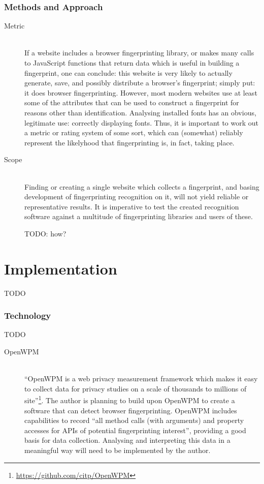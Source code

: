 \documentclass[a4paper, 12pt]{scrreprt}
\begin{document}
    \subsection{Methods and Approach}
    \begin{description}
        \item[Metric] \hfill \\
            If a website includes a browser fingerprinting library, or makes many calls to JavaScript functions that return
            data which is useful in building a fingerprint, one can conclude: this website is very likely to actually
            generate, save, and possibly distribute a browser's fingerprint; simply put: it does browser fingerprinting.
            However, most modern websites use at least some of the attributes that can be used to construct a fingerprint
            for reasons other than identification. Analysing installed fonts has an obvious, legitimate use: correctly displaying
            fonts. Thus, it is important to work out a metric or rating system of some sort, which can
            (somewhat) reliably represent the likelyhood that fingerprinting is, in fact, taking place.

        \item[Scope] \hfill \\
            Finding or creating a single website which collects a fingerprint, and basing development of fingerprinting
            recognition on it, will not yield reliable or representative results. It is imperative to test
            the created recognition software against a multitude of fingerprinting libraries and users of these.

            TODO: how?
    \end{description}

\chapter{Implementation}
TODO

    \subsection{Technology}
    TODO

    \begin{description}
        \item[OpenWPM] \hfill \\
            ``OpenWPM is a web privacy measurement framework which makes it easy to collect data for privacy studies on a scale
            of thousands to millions of site''\footnote{\url{https://github.com/citp/OpenWPM}}.
            The author is planning to build upon OpenWPM\cite{englehardt2016census} to create a software that can detect
            browser fingerprinting. OpenWPM includes capabilities to record
            ``all method calls (with arguments) and property accesses for APIs of potential fingerprinting interest'',
            providing a good basis for data collection. Analysing and interpreting this data in a meaningful way
            will need to be implemented by the author.
    \end{description}

\clearpage

\printbibliography
\end{document}
